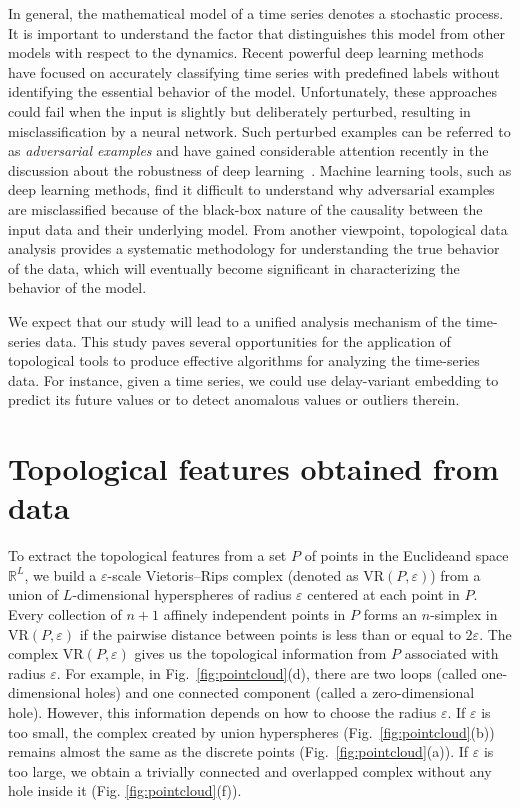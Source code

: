\documentclass[twocolumn,pre,amsmath,amssymb]{revtex4-1}
\begin{document}
In general, the mathematical model of a time series denotes a stochastic process.
It is important to understand the factor that distinguishes this model
from other models with respect to the dynamics.
Recent powerful deep learning methods 
have focused on accurately classifying time series 
with predefined labels without identifying the essential behavior of the model.
Unfortunately, these approaches could fail 
when the input is slightly but deliberately perturbed,
resulting in misclassification by a neural network.
Such perturbed examples can be referred to as \textit{adversarial examples}
and have gained considerable attention recently in the discussion about the robustness of deep learning~\cite{szegedy:adversarial:2014}.
Machine learning tools, such as deep learning methods, 
find it difficult to understand why adversarial examples are misclassified
because of the black-box nature of the causality between the input data and their underlying model.
From another viewpoint, topological data analysis provides a systematic methodology 
for understanding the true behavior of the data, 
which will eventually become significant
in characterizing the behavior of the model.

We expect that our study will lead to a unified analysis mechanism of the time-series data.
This study paves several opportunities for the application of topological tools 
to produce effective algorithms for analyzing the time-series data. 
For instance, given a time series, we could use delay-variant embedding
to predict its future values or to detect anomalous values or outliers therein.

\appendix
\section{Topological features obtained from data\label{sec:topo:features}}
	
    To extract the topological features from a set $P$ of points in the Euclideand space $\mathbb{R}^L$, we build a $\varepsilon$-scale Vietoris--Rips complex (denoted as $\text{VR}(P, \varepsilon)$) from a union of $L$-dimensional hyperspheres of radius $\varepsilon$ centered at each point in $P$. Every collection of $n+1$ affinely independent points in $P$ forms an $n$-simplex in $\text{VR}(P, \varepsilon)$ if the pairwise distance between points is less than or equal to $2\varepsilon$. The complex $\text{VR}(P, \varepsilon)$ gives us the topological information from $P$ associated with radius $\varepsilon$. For example, in Fig.~\ref{fig:pointcloud}(d), there are two loops (called one-dimensional holes) and one connected component (called a zero-dimensional hole). However, this information depends on how to choose the radius $\varepsilon$. If $\varepsilon$ is too small, the complex created by union hyperspheres (Fig.~\ref{fig:pointcloud}(b)) remains almost the same as the discrete points (Fig.~\ref{fig:pointcloud}(a)). If $\varepsilon$ is too large, we obtain a trivially connected and overlapped complex without any hole inside it (Fig. \ref{fig:pointcloud}(f)).
\end{document}
